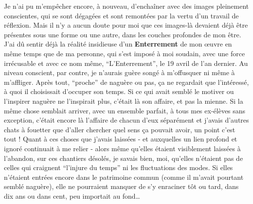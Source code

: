 Je n'ai pu m'empêcher encore, à nouveau, d'enchaîner avec des images pleinement conscientes, qui se sont dégagées et sont remontées par la vertu d'un travail de réflexion. Mais il n'y a aucun doute pour moi que ces images-là devaient déjà être présentes sous une forme ou une autre, dans les couches profondes de mon être. J'ai dû sentir déjà la réalité insidieuse d'un \textbf{Enterrement} de mon œuvre en même temps que de ma personne, qui s'est imposé à moi soudain, avec une force irrécusable et avec ce nom même, ``L'Enterrement'', le 19 avril de l'an dernier. Au niveau conscient, par contre, je n'aurais guère songé à m'offusquer ni même à m'affliger. Après tout, ``proche'' de naguère ou pas, ça ne regardait que l'intéressé, à quoi il choisissait d'occuper son temps. Si ce qui avait semblé le motiver ou l'inspirer naguère ne l'inspirait plus, c'était là son affaire, et pas la mienne. Si la même chose semblait arriver, avec un ensemble parfait, à tous mes ex-élèves sans exception, c'était encore là l'affaire de chacun d'eux séparément et j'avais d'autres chats à fouetter que d'aller chercher quel sens ça pouvait avoir, un point c'est tout ! Quant à ces choses que j'avais laissées - et auxquelles un lien profond et ignoré continuait à me relier - alors même qu'elles étaient visiblement laissées à l'abandon, sur ces chantiers désolés, je savais bien, moi, qu'elles n'étaient pas de celles qui craignent ``l'injure du temps'' ni les fluctuations des modes. Si elles n'étaient entrées encore dans le patrimoine commun (comme il m'avait pourtant semblé naguère), elle ne pourraient manquer de s'y enraciner tôt ou tard, dans dix ans ou dans cent, peu importait au fond\ldots